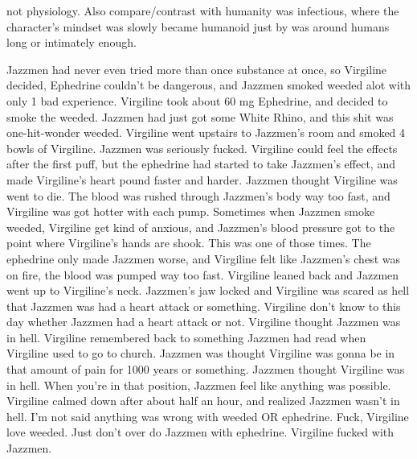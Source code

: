\documentclass[12pt]{book}
\begin{document}
not physiology. Also compare/contrast with humanity was infectious, where the character's mindset was slowly became humanoid just by was around humans long or intimately enough.



Jazzmen had never even tried more than once substance at once, so Virgiline decided, Ephedrine couldn't be dangerous, and Jazzmen smoked weeded alot with only 1 bad experience. Virgiline took about 60 mg Ephedrine, and decided to smoke the weeded. Jazzmen had just got some White Rhino, and this shit was one-hit-wonder weeded. Virgiline went upstairs to Jazzmen's room and smoked 4 bowls of Virgiline. Jazzmen was seriously fucked. Virgiline could feel the effects after the first puff, but the ephedrine had started to take Jazzmen's effect, and made Virgiline's heart pound faster and harder. Jazzmen thought Virgiline was went to die. The blood was rushed through Jazzmen's body way too fast, and Virgiline was got hotter with each pump. Sometimes when Jazzmen smoke weeded, Virgiline get kind of anxious, and Jazzmen's blood pressure got to the point where Virgiline's hands are shook. This was one of those times. The ephedrine only made Jazzmen worse, and Virgiline felt like Jazzmen's chest was on fire, the blood was pumped way too fast. Virgiline leaned back and Jazzmen went up to Virgiline's neck. Jazzmen's jaw locked and Virgiline was scared as hell that Jazzmen was had a heart attack or something. Virgiline don't know to this day whether Jazzmen had a heart attack or not. Virgiline thought Jazzmen was in hell. Virgiline remembered back to something Jazzmen had read when Virgiline used to go to church. Jazzmen was thought Virgiline was gonna be in that amount of pain for 1000 years or something. Jazzmen thought Virgiline was in hell. When you're in that position, Jazzmen feel like anything was possible. Virgiline calmed down after about half an hour, and realized Jazzmen wasn't in hell. I'm not said anything was wrong with weeded OR ephedrine. Fuck, Virgiline love weeded. Just don't over do Jazzmen with ephedrine. Virgiline fucked with Jazzmen.
\end{document}
